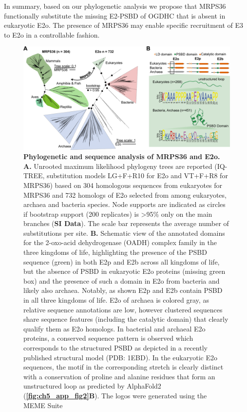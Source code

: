In summary, based on our phylogenetic analysis we propose that MRPS36 functionally substitute the missing E2-PSBD of OGDHC that is absent in eukaryotic E2o. The presence of MRPS36 may enable specific recruitment of E3 to E2o in a controllable fashion.
\raggedbottom
\begin{figure}[htb!]
    \centering
    \includegraphics[]{Chapter.5/Figures/Figure3.png}
    \caption{\textbf{Phylogenetic and sequence analysis of MRPS36 and E2o.} \textbf{A.} Unrooted maximum likelihood phylogeny trees are reported (IQ-TREE, substitution models LG+F+R10 for E2o and VT+F+R8 for MRPS36) based on 304 homologous sequences from eukaryotes for MRPS36 and 732 homologs of E2o selected from among eukaryotes, archaea and bacteria species. Node supports are indicated as circles if bootstrap support (200 replicates) is >95\% only on the main branches (\textbf{SI Data}). The scale bar represents the average number of substitutions per site. \textbf{B.} Schematic view of the annotated domains for the 2-oxo-acid dehydrogenase (OADH) complex family in the three kingdoms of life, highlighting the presence of the PSBD sequence (green) in both E2p and E2b across all kingdoms of life, but the absence of PSBD in eukaryotic E2o proteins (missing green box) and the presence of such a domain in E2o from bacteria and likely also archaea. Notably, as shown E2p and E2b contain PSBD in all three kingdoms of life. E2o of archaea is colored gray, as relative sequence annotations are low, however clustered sequences share sequence features (including the catalytic domain) that clearly qualify them as E2o homologs. In bacterial and archaeal E2o proteins, a conserved sequence pattern is observed which corresponds to the structured PSBD as depicted in a recently published structural model \cite{Mande_1996} (PDB: 1EBD). In the eukaryotic E2o sequences, the motif in the corresponding stretch is clearly distinct with a conservation of proline and alanine residues that form an unstructured loop as predicted by AlphaFold2 (\textbf{\autoref{fig:ch5_app_fig2}B}). The logos were generated using the MEME Suite \cite{Bailey_2015}}
    \label{fig:ch5_fig3}
\end{figure}
%
